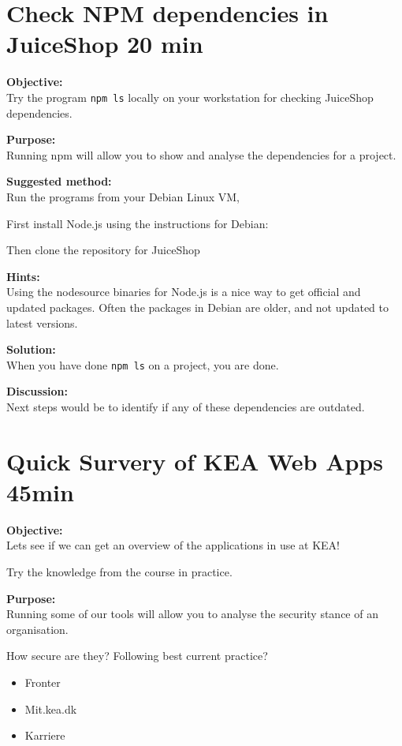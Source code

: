 \documentclass[a4paper,11pt,notitlepage]{report}
\begin{document}
\chapter{Check NPM dependencies in JuiceShop 20 min}
\label{ex:npm-depend-js}

{\bf Objective:}\\
Try the program \verb+npm ls+ locally on your workstation for checking JuiceShop dependencies.


{\bf Purpose:}\\
Running npm will allow you to show and analyse the dependencies for a project.


{\bf Suggested method:}\\
Run the programs from your Debian Linux VM,

First install Node.js using the instructions for Debian:\\

Then clone the repository for JuiceShop 


{\bf Hints:}\\
Using the nodesource binaries for Node.js is a nice way to get official and updated packages. Often the packages in Debian are older, and not updated to latest versions.

{\bf Solution:}\\
When you have done \verb+npm ls+ on a project, you are done.

{\bf Discussion:}\\
Next steps would be to identify if any of these dependencies are outdated.






\chapter{Quick Survery of KEA Web Apps   45min}
\label{ex:kea-web-apps}

{\bf Objective:}\\
Lets see if we can get an overview of the applications in use at KEA!

Try the knowledge from the course in practice.


{\bf Purpose:}\\
Running some of our tools will allow you to analyse the security stance of an organisation.

How secure are they? Following best current practice?
\begin{itemize}
\item Fronter 
\item Mit.kea.dk 
\item Karriere 
\end{itemize}
\end{document}
